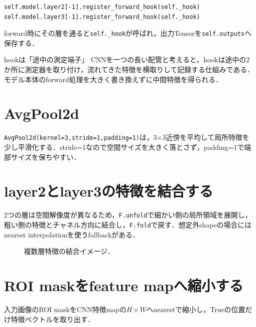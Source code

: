 \documentclass[a4paper,11pt]{ltjsreport}
\begin{document}
\begin{lstlisting}
self.model.layer2[-1].register_forward_hook(self._hook)
self.model.layer3[-1].register_forward_hook(self._hook)
\end{lstlisting}

forward時にその層を通ると\texttt{self._hook}が呼ばれ，出力Tensorを\texttt{self.outputs}へ保存する．

\begin{imagebox}{hookは「途中の測定端子」}
CNNを一つの長い配管と考えると，hookは途中の2か所に測定器を取り付け，流れてきた特徴を横取りして記録する仕組みである．モデル本体のforward処理を大きく書き換えずに中間特徴を得られる．
\end{imagebox}

\section{AvgPool2d}
\texttt{AvgPool2d(kernel=3,stride=1,padding=1)}は，3×3近傍を平均して局所特徴を少し平滑化する．stride=1なので空間サイズを大きく落とさず，padding=1で端部サイズを保ちやすい．

\section{layer2とlayer3の特徴を結合する}
2つの層は空間解像度が異なるため，\texttt{F.unfold}で細かい側の局所領域を展開し，粗い側の特徴とチャネル方向に結合し，\texttt{F.fold}で戻す．想定外shapeの場合にはnearest interpolationを使うfallbackがある．

\begin{figure}[H]
\centering
{}
\caption{複数層特徴の結合イメージ．}
\end{figure}

\section{ROI maskをfeature mapへ縮小する}
入力画像のROI maskをCNN特徴mapの\(H\times W\)へnearestで縮小し，Trueの位置だけ特徴ベクトルを取り出す．
\end{document}
